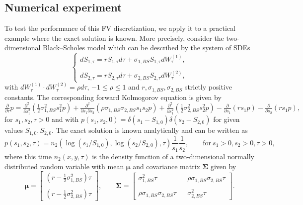\documentclass[10pt]{article}
\begin{document}
\subsection{Numerical experiment}

To test the performance of this FV discretization, we apply it to a practical example where the exact solution is known. More precisely, consider the two-dimensional Black--Scholes model which can be described by the system of SDEs
\begin{equation}
\left\{ \begin{array}{l}
dS_{1,\tau} = r S_{1,\tau} d\tau + \sigma_{1,BS} S_{1,\tau} dW^{(1)}_{\tau}, \\\\
dS_{2,\tau} = r S_{2,\tau} d\tau + \sigma_{2,BS} S_{2,\tau} dW^{(2)}_{\tau},
\end{array} \right.
\end{equation}
with $dW^{(1)}_{\tau} \cdot dW^{(2)}_{\tau} = \rho d\tau$, $-1 \le \rho \le 1$ and $r, \sigma_{1,BS},\sigma_{2,BS}$ strictly positive constants. The corresponding forward Kolmogorov equation is given by
\begin{equation}
\tfrac{\partial}{\partial \tau} p = \tfrac{\partial^{2}}{\partial s_{1}^{2}} \left( \tfrac{1}{2} \sigma_{1,BS}^{2}s_{1}^{2}p \right) + \tfrac{\partial^{2}}{\partial s_{1} \partial s_{2}} \left( \rho \sigma_{1,BS} \sigma_{2,BS} s_{1} s_{2} p \right) + \tfrac{\partial^{2}}{\partial s_{1}^{2}} \left( \tfrac{1}{2} \sigma_{2,BS}^{2} s_{2}^{2} p \right) - \tfrac{\partial}{\partial s_{1}} \left( r s_{1} p \right) - \tfrac{\partial}{\partial s_{2}} \left( r s_{1} p \right),
\end{equation}
for $s_{1}, s_{2}, \tau > 0$ and with $p(s_{1},s_{2},0)=\delta(s_{1}-S_{1,0})\delta(s_{2}-S_{2,0})$ for given values $S_{1,0}, S_{2,0}$.
The exact solution is known analytically and can be written as
\begin{equation}
p(s_{1},s_{2},\tau) = n_{2}(\log(s_{1}/S_{1,0}),\log(s_{2}/S_{2,0}),\tau)\frac{1}{s_{1}}\frac{1}{s_{2}}, \qquad \mathrm{for} \ s_{1}>0, s_{2}>0, \tau > 0,
\end{equation}
where this time $n_{2}(x,y,\tau)$ is the density function of a two-dimensional normally distributed random variable with mean $\boldsymbol{\mu}$ and covariance matrix $\boldsymbol{\Sigma}$ given by
$$ \boldsymbol{\mu} = \left[ \begin{array}{c}
(r - \tfrac{1}{2} \sigma^{2}_{1,BS})\tau \\\\ (r - \tfrac{1}{2} \sigma^{2}_{2,BS})\tau
\end{array} \right], \qquad
\boldsymbol{\Sigma} = \left[ \begin{array}{ccc}
\sigma^{2}_{1,BS}\tau && \rho \sigma_{1,BS}\sigma_{2,BS}\tau  \\\\
\rho \sigma_{1,BS}\sigma_{2,BS}\tau && \sigma^{2}_{2,BS}\tau
\end{array} \right]. $$
\end{document}
